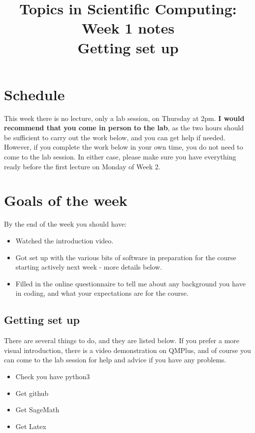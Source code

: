 \documentclass[11pt]{article}
\begin{document}
\date{}
\title{\textbf{Topics in Scientific Computing: Week 1 notes} \\ Getting set up}
\maketitle

\section{Schedule}

This week there is no lecture, only a lab session, on Thursday at 2pm. \textbf{I would recommend that you come in person to the lab}, as the two hours should be sufficient to carry out the work below, and you can get help if needed.
However, if you complete the work below in your own time, you do not need to come to the lab session. 
In either case, please make sure you have everything ready before the first lecture on Monday of Week 2. 

\section{Goals of the week}

By the end of the week you should have:
\begin{itemize}
\item{Watched the introduction video.}
\item Got set up with the various bits of software in preparation for the course starting actively next week - more details below. 
\item Filled in the online questionnaire to tell me about any background you have in coding, and what your expectations are for the course.
\end{itemize}

\subsection{Getting set up}

There are several things to do, and they are listed below. If you prefer a more visual introduction, there is a video demonstration on QMPlus, and of course you can come to the lab session for help and advice if you have any problems.

\begin{itemize}
\item Check you have python3
\item Get github
\item Get SageMath
\item Get Latex
\end{itemize}






 
\end{document}
